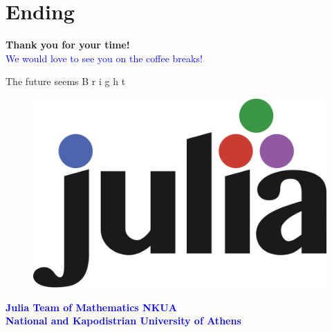 \documentclass[slidestop,compress,mathserif]{beamer}
\begin{document}
\section{Ending}
\begin{frame}[fragile]{}
%
    \begin{center}
        \fontsize{20pt}{7.2}\selectfont \textbf{Thank you for your time!}\\\vfill
        \fontsize{15pt}{7.2}\selectfont \textcolor{blue}{We would love to see you on the coffee breaks!}
    \end{center}

\vfill
\begin{center}
The future seems \textcolor{myred}{B} \textcolor{mygreen}{r} \textcolor{mypurple}{i} \textcolor{myred}{g} \textcolor{mygreen}{h} \textcolor{mypurple}{t}
\begin{figure}
\includegraphics[scale=0.07]{julia.png}
\end{figure}
\end{center}\vfill
\begin{center}
	\textcolor{blue}{\scriptsize \textbf{Julia Team of Mathematics NKUA \\
                 National and Kapodistrian University of Athens\\ } }

 \hyperlink{target2}{}
\end{center}
\vfill

\end{frame}
\end{document}
